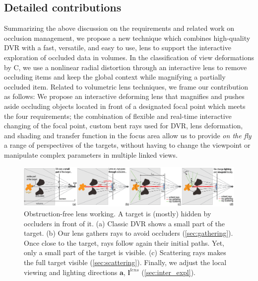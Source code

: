 \subsection{Detailed contributions}
%
Summarizing the above discussion on the requirements and related work on occlusion management, we propose a new technique which combines high-quality DVR with a fast, versatile, and easy to use, lens to support the interactive exploration of occluded data in volumes. In the classification of view deformations by C\cite{595268}, we use a nonlinear radial distortion through an interactive lens to remove occluding items and keep the global context while magnifying a partially occluded item. Related to volumetric lens techniques, we frame our contribution as follows: We propose an interactive deforming lens that magnifies and pushes aside occluding objects located in front of a designated focal point which meets the four requirements; the combination of flexible and real-time interactive changing of the focal point, custom bent rays used for DVR, lens deformation, and shading and transfer function in the focus area allow us to provide \emph{on the fly} a range of perspectives of the targets, without having to change the viewpoint or manipulate complex parameters in multiple linked views.


\begin{figure}
\centering

\includegraphics [width=\textwidth]{images/principle.eps}

\caption{Obstruction-free lens working. A target is (mostly) hidden by occluders in front of it. (a) Classic DVR shows a small part of the target. (b) Our lens gathers rays to avoid occluders (\autoref{sec:gathering}). Once close to the target, rays follow again their initial paths. Yet, only a small part of the target is visible. (c) Scattering rays makes the full target visible (\autoref{sec:scattering}). Finally, we adjust the local viewing and lighting directions $\mathbf{a}$, $\mathbf{l}^{lens}$ (\autoref{sec:inter_expl}).}
\label{f:fisheye}

\end{figure}


